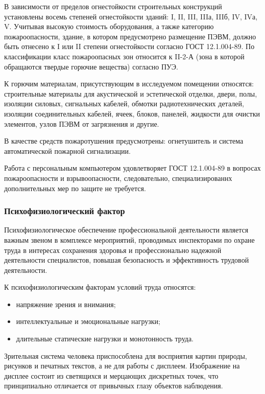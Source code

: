 В зависимости от пределов огнестойкости строительных конструкций установлены восемь степеней огнестойкости зданий: I, II, III, IIIа, IIIб, IV, IVа, V. Учитывая высокую стоимость оборудования, а также категорию пожароопасности, здание, в котором предусмотрено размещение ПЭВМ, должно быть отнесено к I или II степени огнестойкости согласно ГОСТ 12.1.004-89. По классификации класс пожароопасных зон относится к II-2-А (зона в которой обращаются твердые горючие вещества) согласно ПУЭ.

К горючим материалам, присутствующим в исследуемом помещении относятся: строительные материалы для акустической и эстетической отделки, двери, полы, изоляции силовых, сигнальных кабелей, обмотки радиотехнических деталей, изоляции соединительных кабелей, ячеек, блоков, панелей, жидкости для очистки элементов, узлов ПЭВМ от загрязнения и другие.

В качестве средств пожаротушения предусмотрены: огнетушитель и система автоматической пожарной сигнализации.

Работа с персональным компьютером удовлетворяет ГОСТ 12.1.004-89 в вопросах пожароопасности и взрывоопасности, следовательно, специализированнх дополнительных мер по защите не требуется.

\subsubsection{Психофизиологический фактор}

Психофизиологическое обеспечение профессиональной деятельности является важным звеном в комплексе мероприятий, проводимых инспекторами по охране труда в интересах сохранения здоровья и профессионально надежной деятельности специалистов, повышая безопасность и эффективность трудовой деятельности. 

К психофизиологическим факторам условий труда относятся: 

\begin{itemize}
  \item напряжение зрения и внимания;
  \item интеллектуальные и эмоциональные нагрузки;
  \item длительные статические нагрузки и монотонность труда.
\end{itemize}

Зрительная система человека приспособлена для восприятия картин природы, рисунков и печатных текстов, а не для работы с дисплеем. Изображение на дисплее состоит из светящихся и мерцающих дискретных точек, что принципиально отличается от привычных глазу объектов наблюдения.


